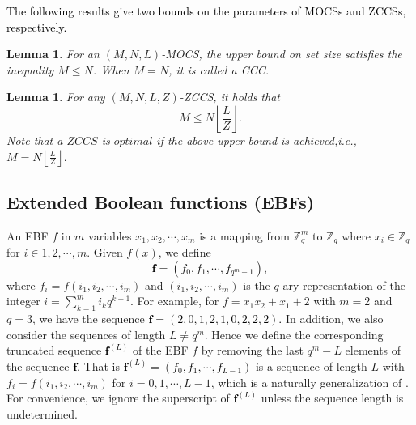 \documentclass[11pt]{article}
\newcommand{\2} {$2$-to-$1$}
\newtheorem{lem}[thm]{\bfseries   Lemma}
\begin{document}
\textcolor{black}{The following results give two bounds on the parameters of MOCSs and ZCCSs, respectively.}
\begin{lem}\textrm{\cite{SN}}
	For an $(M,N,L)$-MOCS, the upper bound on set size satisfies the inequality $M\leq N$. When $M=N$, it is called a CCC.
\end{lem}

\begin{lem}\cite{FL} \label{15}
	For any $(M,N,L,Z)$-ZCCS, it holds that $$M\leq N\left \lfloor\frac{L}{Z}\right\rfloor.$$
Note that	a $ZCCS$ is $optimal$ if the above upper bound is achieved,i.e., $M= N\left \lfloor\frac{L}{Z}\right\rfloor.$
\end{lem}



\subsection{Extended Boolean functions (EBFs)}

An EBF $f$ in $m$ variables $x_{1},x_{2},\cdots,x_{m}$ is a mapping from $\mathbb{Z}_{q}^{m}$ to $\mathbb{Z}_{q}$ where $x_{i}\in \mathbb{Z}_{q}$ for $i\in 1,2,\cdots,m$. Given $f(x)$, we define \textcolor{black}{$$\mathbf{f}=(f_{0},f_{1},\cdots,f_{q^{m}-1}),$$}where $f_{i}=f(i_{1},i_{2},\cdots,i_{m})$ and $(i_{1},i_{2},\cdots,i_{m})$ is the $q$-ary representation of the integer $i=\sum^{m}_{k=1}i_{k}q^{k-1}
$.  For example, for $f=x_{1}x_{2}+x_{1}+2$ with $m=2$ and $q=3$, we have the sequence \textcolor{black}{$\mathbf{f}=(2,0,1,2,1,0,2,2,2).$} In addition, we also consider the sequences of length $L\neq q^m.$  Hence we define the corresponding truncated sequence \textcolor{black}{$\mathbf{f}^{(L)}$} of the EBF $f$ by removing the last $q^m-L$ elements of the sequence \textcolor{black}{$\mathbf{f}$}. That is \textcolor{black}{$\mathbf{f}^{(L)}=(f_{0},f_{1},\cdots,f_{L-1})$} is a sequence of length $L$ with $f_{i}=f(i_{1},i_{2},\cdots,i_{m})$ for $i= 0,1,\cdots,L-1$, which is a naturally generalization of \cite{CC}. For convenience, we ignore the superscript of \textcolor{black}{$\mathbf{f}^{(L)}$} unless the sequence length is undetermined.
\end{document}
